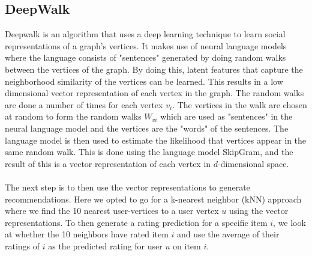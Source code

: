\subsection{DeepWalk}
Deepwalk is an algorithm that uses a deep learning technique to learn social representations of a graph's vertices\cite{DeepWalk}.
It makes use of neural language models where the language consists of "sentences" generated by doing random walks between the vertices of the graph.
By doing this, latent features that capture the neighborhood similarity of the vertices can be learned.
This results in a low dimensional vector representation of each vertex in the graph.
The random walks are done a number of times for each vertex $v_i$.
The vertices in the walk are chosen at random to form the random walks $W_{vi}$ which are used as "sentences" in the neural language model and the vertices are the "words" of the sentences.
The language model is then used to estimate the likelihood that vertices appear in the same random walk.
This is done using the language model SkipGram, and the result of this is a vector representation of each vertex in $d$-dimensional space.
\\\\
The next step is to then use the vector representations to generate recommendations.
Here we opted to go for a k-nearest neighbor (kNN) approach where we find the 10 nearest user-vertices to a user vertex $u$ using the vector representations.
To then generate a rating prediction for a specific item $i$, we look at whether the 10 neighbors have rated item $i$ and use the average of their ratings of $i$ as the predicted rating for user $u$ on item $i$.

